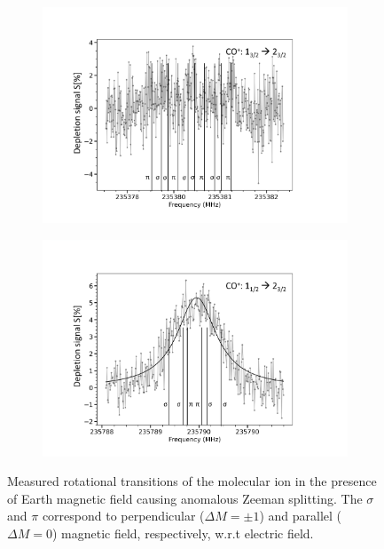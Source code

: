 \begin{figure}[!htb]
\begin{subfigure}[b]{0.49\textwidth}
        \includegraphics[width=1\textwidth]{chapters/CO+_ROSAA_paper/235_380_CO+_fig.pdf}
        \caption{}
        \label{fig:235_380}
    \end{subfigure}
    \hfill
    \begin{subfigure}[b]{0.49\textwidth}
        \centering
        \includegraphics[width=1\textwidth]{chapters/CO+_ROSAA_paper/235_789_CO+_fig.pdf}
        \caption{}
        \label{fig:235_789}
    \end{subfigure}
    \caption{Measured rotational transitions of the \co molecular ion in the presence of Earth magnetic field causing anomalous Zeeman splitting. The $\sigma$ and $\pi$ correspond to perpendicular ($\Delta M=\pm1$) and parallel ($\Delta M=0$) magnetic field, respectively, w.r.t electric field.}
    \label{fig:full}
\end{figure}

